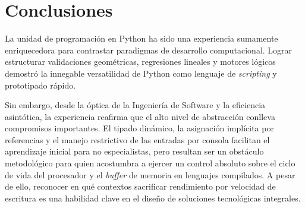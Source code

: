 \newpage

\section{Conclusiones}

La unidad de programación en Python ha sido una experiencia sumamente enriquecedora para contrastar paradigmas de desarrollo computacional. Lograr estructurar validaciones geométricas, regresiones lineales y motores lógicos demostró la innegable versatilidad de Python como lenguaje de \textit{scripting} y prototipado rápido.

Sin embargo, desde la óptica de la Ingeniería de Software y la eficiencia asintótica, la experiencia reafirma que el alto nivel de abstracción conlleva compromisos importantes. El tipado dinámico, la asignación implícita por referencias y el manejo restrictivo de las entradas por consola facilitan el aprendizaje inicial para no especialistas, pero resultan ser un obstáculo metodológico para quien acostumbra a ejercer un control absoluto sobre el ciclo de vida del procesador y el \textit{buffer} de memoria en lenguajes compilados. A pesar de ello, reconocer en qué contextos sacrificar rendimiento por velocidad de escritura es una habilidad clave en el diseño de soluciones tecnológicas integrales.
